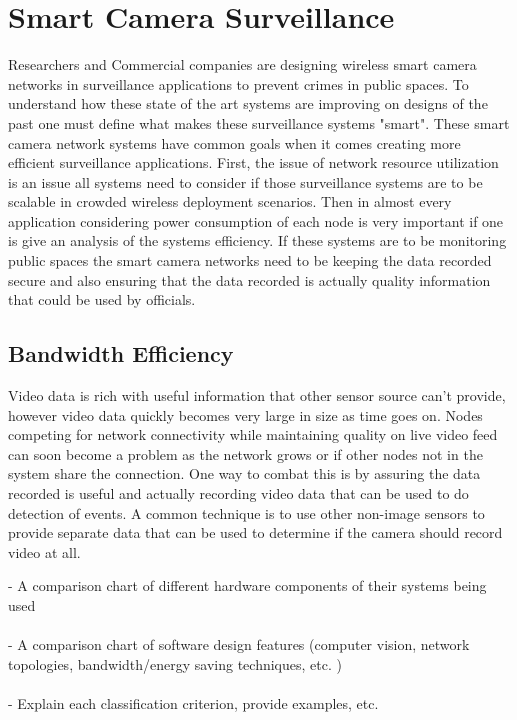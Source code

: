 \documentclass[journal,transmag]{IEEEtran}
\begin{document}

\section{Smart Camera Surveillance}
Researchers and Commercial companies are designing wireless smart camera networks in surveillance applications to prevent crimes in public spaces. To
understand how these state of the art systems are improving on designs of the past one must define what makes these surveillance systems "smart". These
smart camera network systems have common goals when it comes creating more efficient surveillance applications. First, the issue of network resource
utilization is an issue all systems need to consider if those surveillance systems are to be scalable in crowded wireless deployment scenarios. Then in
almost every application considering power consumption of each node is very important if one is give an analysis of the systems efficiency. If these
systems are to be monitoring public spaces the smart camera networks need to be keeping the data recorded secure and also ensuring that the data recorded
is actually quality information that could be used by officials. \\


\subsection{Bandwidth Efficiency}
Video data is rich with useful information that other sensor source can’t provide, however video data quickly becomes very large in size as time goes on.
Nodes competing for network connectivity while maintaining quality on live video feed can soon become a problem as the network grows or if other nodes
not in the system share the connection. One way to combat this is by assuring the data recorded is useful and actually recording video data that can be
used to do detection of events. A common technique is to use other non-image sensors to provide separate data that can be used to determine if the camera
should record video at all.

\-- A comparison chart of different hardware components of their systems 
	being used\\ \\
\-- A comparison chart of software design features (computer vision, network
	topologies, bandwidth/energy saving techniques, etc. )\\ \\
\-- Explain each classification criterion, provide examples, etc.\\ \\
\end{document}
